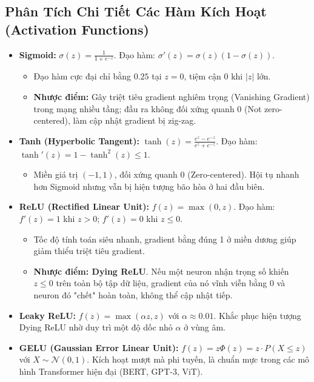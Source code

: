 \documentclass[10pt,a4paper]{article}
\begin{document}
\subsection{Phân Tích Chi Tiết Các Hàm Kích Hoạt (Activation Functions)}
\begin{itemize}[leftmargin=*]
    \item \textbf{Sigmoid:} $\sigma(z) = \frac{1}{1 + e^{-z}}$. Đạo hàm: $\sigma'(z) = \sigma(z)(1 - \sigma(z))$.
    \begin{itemize}
        \item Đạo hàm cực đại chỉ bằng $0.25$ tại $z=0$, tiệm cận $0$ khi $|z|$ lớn.
        \item \textbf{Nhược điểm:} Gây triệt tiêu gradient nghiêm trọng (Vanishing Gradient) trong mạng nhiều tầng; đầu ra không đối xứng quanh 0 (Not zero-centered), làm cập nhật gradient bị zig-zag.
    \end{itemize}
    \item \textbf{Tanh (Hyperbolic Tangent):} $\tanh(z) = \frac{e^z - e^{-z}}{e^z + e^{-z}}$. Đạo hàm: $\tanh'(z) = 1 - \tanh^2(z) \le 1$.
    \begin{itemize}
        \item Miền giá trị $(-1, 1)$, đối xứng quanh 0 (Zero-centered). Hội tụ nhanh hơn Sigmoid nhưng vẫn bị hiện tượng bão hòa ở hai đầu biên.
    \end{itemize}
    \item \textbf{ReLU (Rectified Linear Unit):} $f(z) = \max(0, z)$. Đạo hàm: $f'(z) = 1$ khi $z > 0$; $f'(z) = 0$ khi $z \le 0$.
    \begin{itemize}
        \item Tốc độ tính toán siêu nhanh, gradient bằng đúng 1 ở miền dương giúp giảm thiểu triệt tiêu gradient.
        \item \textbf{Nhược điểm: Dying ReLU}. Nếu một neuron nhận trọng số khiến $z \le 0$ trên toàn bộ tập dữ liệu, gradient của nó vĩnh viễn bằng 0 và neuron đó "chết" hoàn toàn, không thể cập nhật tiếp.
    \end{itemize}
    \item \textbf{Leaky ReLU:} $f(z) = \max(\alpha z, z)$ với $\alpha \approx 0.01$. Khắc phục hiện tượng Dying ReLU nhờ duy trì một độ dốc nhỏ $\alpha$ ở vùng âm.
    \item \textbf{GELU (Gaussian Error Linear Unit):} $f(z) = z \Phi(z) = z \cdot P(X \le z)$ với $X \sim \mathcal{N}(0, 1)$. Kích hoạt mượt mà phi tuyến, là chuẩn mực trong các mô hình Transformer hiện đại (BERT, GPT-3, ViT).
\end{itemize}
\end{document}
